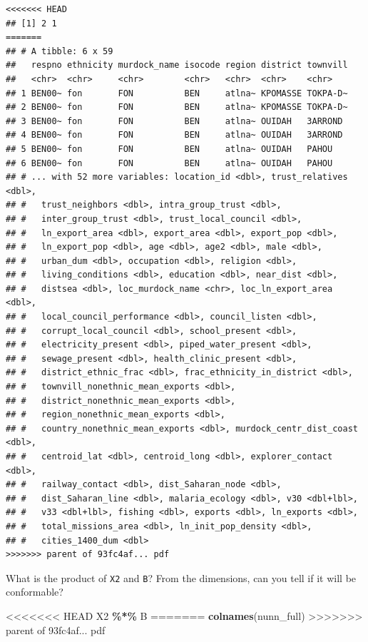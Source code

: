 \documentclass[]{book}
\newenvironment{Shaded}{\begin{snugshade}}{\end{snugshade}}
\newcommand{\KeywordTok}[1]{\textcolor[rgb]{0.13,0.29,0.53}{\textbf{#1}}}
\newcommand{\NormalTok}[1]{#1}
\newcommand{\OperatorTok}[1]{\textcolor[rgb]{0.81,0.36,0.00}{\textbf{#1}}}
\newcommand{\StringTok}[1]{\textcolor[rgb]{0.31,0.60,0.02}{#1}}
\theoremstyle{definition}
\theoremstyle{definition}
\theoremstyle{definition}
\theoremstyle{remark}
\begin{document}
\begin{Shaded}
\begin{Highlighting}[]
\begin{Shaded}
\begin{Highlighting}[]
\begin{verbatim}
<<<<<<< HEAD
## [1] 2 1
=======
## # A tibble: 6 x 59
##   respno ethnicity murdock_name isocode region district townvill
##   <chr>  <chr>     <chr>        <chr>   <chr>  <chr>    <chr>   
## 1 BEN00~ fon       FON          BEN     atlna~ KPOMASSE TOKPA-D~
## 2 BEN00~ fon       FON          BEN     atlna~ KPOMASSE TOKPA-D~
## 3 BEN00~ fon       FON          BEN     atlna~ OUIDAH   3ARROND 
## 4 BEN00~ fon       FON          BEN     atlna~ OUIDAH   3ARROND 
## 5 BEN00~ fon       FON          BEN     atlna~ OUIDAH   PAHOU   
## 6 BEN00~ fon       FON          BEN     atlna~ OUIDAH   PAHOU   
## # ... with 52 more variables: location_id <dbl>, trust_relatives <dbl>,
## #   trust_neighbors <dbl>, intra_group_trust <dbl>,
## #   inter_group_trust <dbl>, trust_local_council <dbl>,
## #   ln_export_area <dbl>, export_area <dbl>, export_pop <dbl>,
## #   ln_export_pop <dbl>, age <dbl>, age2 <dbl>, male <dbl>,
## #   urban_dum <dbl>, occupation <dbl>, religion <dbl>,
## #   living_conditions <dbl>, education <dbl>, near_dist <dbl>,
## #   distsea <dbl>, loc_murdock_name <chr>, loc_ln_export_area <dbl>,
## #   local_council_performance <dbl>, council_listen <dbl>,
## #   corrupt_local_council <dbl>, school_present <dbl>,
## #   electricity_present <dbl>, piped_water_present <dbl>,
## #   sewage_present <dbl>, health_clinic_present <dbl>,
## #   district_ethnic_frac <dbl>, frac_ethnicity_in_district <dbl>,
## #   townvill_nonethnic_mean_exports <dbl>,
## #   district_nonethnic_mean_exports <dbl>,
## #   region_nonethnic_mean_exports <dbl>,
## #   country_nonethnic_mean_exports <dbl>, murdock_centr_dist_coast <dbl>,
## #   centroid_lat <dbl>, centroid_long <dbl>, explorer_contact <dbl>,
## #   railway_contact <dbl>, dist_Saharan_node <dbl>,
## #   dist_Saharan_line <dbl>, malaria_ecology <dbl>, v30 <dbl+lbl>,
## #   v33 <dbl+lbl>, fishing <dbl>, exports <dbl>, ln_exports <dbl>,
## #   total_missions_area <dbl>, ln_init_pop_density <dbl>,
## #   cities_1400_dum <dbl>
>>>>>>> parent of 93fc4af... pdf
\end{verbatim}

What is the product of \texttt{X2} and \texttt{B}? From the dimensions, can you tell if it will be conformable?

\begin{Shaded}
\begin{Highlighting}[]
<<<<<<< HEAD
\NormalTok{X2 }\OperatorTok{\%*\%}\StringTok{ }\NormalTok{B}
=======
\KeywordTok{colnames}\NormalTok{(nunn_full)}
>>>>>>> parent of 93fc4af... pdf
\end{Highlighting}
\end{Shaded}


\end{Highlighting}
\end{Shaded}
\end{Highlighting}
\end{Shaded}
\end{document}
